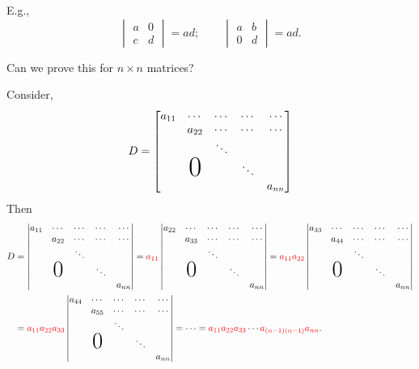 \documentclass[reqno]{amsart}
\theoremstyle{definition}
\newenvironment{handwave}{%
  \renewcommand{\proofname}{Handwavey proof}\proof}{\endproof}
\begin{document}
\begin{enumerate}
E.g.,
\begin{equation*}
\begin{vmatrix}
a & 0\\
c & d
\end{vmatrix} = ad;\qquad \begin{vmatrix}
a & b\\
0 & d
\end{vmatrix} = ad.
\end{equation*}

Can we prove this for $n \times n$ matrices?

\begin{handwave}
Consider,
%
\begin{equation*}
D = \begin{bmatrix}
a_{11} & \cdots & \cdots & \cdots & \cdots \\
 & a_{22} & \cdots & \cdots & \cdots \\
 & & \ddots & & \\
 &\bigzero & & \ddots &  \\
 & & & & a_{nn}
\end{bmatrix}
\end{equation*}
%
Then
%
\begin{align*}
D &= \begin{vmatrix}
a_{11} & \cdots & \cdots & \cdots & \cdots \\
 & a_{22} & \cdots & \cdots & \cdots \\
 & & \ddots & & \\
 &\bigzero & & \ddots &  \\
 & & & & a_{nn}
\end{vmatrix} = {\color{red}a_{11}}\begin{vmatrix}
a_{22} & \cdots & \cdots & \cdots & \cdots \\
 & a_{33} & \cdots & \cdots & \cdots \\
 & & \ddots & & \\
 &\bigzero & & \ddots &  \\
 & & & & a_{nn}
\end{vmatrix} = {\color{red}a_{11}}{\color{red}a_{22}}\begin{vmatrix}
a_{33} & \cdots & \cdots & \cdots & \cdots \\
 & a_{44} & \cdots & \cdots & \cdots \\
 & & \ddots & & \\
 &\bigzero & & \ddots &  \\
 & & & & a_{nn}
\end{vmatrix}\\
&= {\color{red}a_{11}}{\color{red}a_{22}}{\color{red}a_{33}}\begin{vmatrix}
a_{44} & \cdots & \cdots & \cdots & \cdots \\
 & a_{55} & \cdots & \cdots & \cdots \\
 & & \ddots & & \\
 &\bigzero & & \ddots &  \\
 & & & & a_{nn}
 \end{vmatrix}
 = \cdots = {\color{red}a_{11}}{\color{red}a_{22}}{\color{red}a_{33}}\cdots{\color{red}a_{(n-1)(n-1)}}{\color{red}a_{nn}}.
\end{align*}


\end{handwave}
\end{enumerate}
\end{document}
